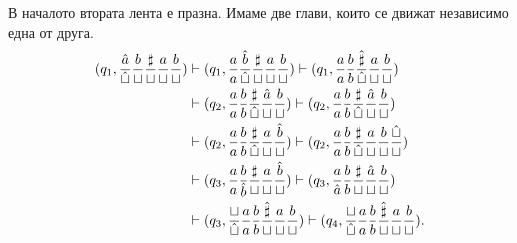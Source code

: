 \begin{example}
В началото втората лента е празна. Имаме две глави, които се движат независимо една от друга.
\begin{align*}
  (q_1, \frac{\hat{a}}{\hat{\sqcup}}\frac{b}{\sqcup}\frac{\sharp}{\sqcup}\frac{a}{\sqcup}\frac{b}{\sqcup}) & \vdash (q_1, \frac{a}{a}\frac{\hat{b}}{\hat{\sqcup}}\frac{\sharp}{\sqcup}\frac{a}{\sqcup}\frac{b}{\sqcup}) \vdash (q_1, \frac{a}{a}\frac{b}{b}\frac{\hat{\sharp}}{\hat{\sqcup}}\frac{a}{\sqcup}\frac{b}{\sqcup}) \\
                                                                                                           & \vdash (q_2, \frac{a}{a}\frac{b}{b}\frac{\sharp}{\hat{\sqcup}}\frac{\hat{a}}{\sqcup}\frac{b}{\sqcup}) \vdash (q_2, \frac{a}{a}\frac{b}{b}\frac{\sharp}{\hat{\sqcup}}\frac{\hat{a}}{\sqcup}\frac{b}{\sqcup})\\
                                                                                                           & \vdash (q_2, \frac{a}{a}\frac{b}{b}\frac{\sharp}{\hat{\sqcup}}\frac{a}{\sqcup}\frac{\hat{b}}{\sqcup}) \vdash (q_2, \frac{a}{a}\frac{b}{b}\frac{\sharp}{\hat{\sqcup}}\frac{a}{\sqcup}\frac{b}{\sqcup}\frac{\hat{\sqcup}}{\sqcup})\\
                                                                                                           & \vdash (q_3, \frac{a}{a}\frac{b}{\hat{b}}\frac{\sharp}{\sqcup}\frac{a}{\sqcup}\frac{\hat{b}}{\sqcup}) \vdash (q_3, \frac{a}{\hat{a}}\frac{b}{b}\frac{\sharp}{\sqcup}\frac{\hat{a}}{\sqcup}\frac{b}{\sqcup}) \\
                                                                                                           & \vdash (q_3, \frac{\sqcup}{\hat{\sqcup}}\frac{a}{a}\frac{b}{b}\frac{\hat{\sharp}}{\sqcup}\frac{a}{\sqcup}\frac{b}{\sqcup}) \vdash (q_4, \frac{\sqcup}{\hat{\sqcup}}\frac{a}{a}\frac{b}{b}\frac{\hat{\sharp}}{\sqcup}\frac{a}{\sqcup}\frac{b}{\sqcup}).
\end{align*}

\end{example}




